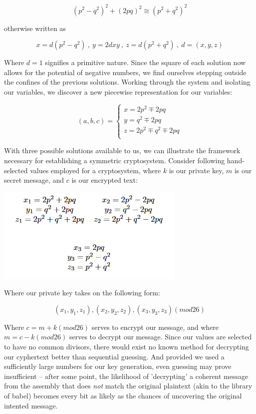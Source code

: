 \documentclass{article}
\begin{document}
$$ (p^2-q^2)^2 +(2pq)^2 \cong (p^2+q^2)^2 $$

otherwise written as

$$ x = d(p^2 - q^2) \ , \ y = 2dxy \ , \  z = d(p^2 + q^2) \ , \ d = (x,y,z) $$

Where $d=1$ signifies a primitive nature. Since the square of each solution now allows for the potential of negative numbers, we find ourselves stepping outside the confines of the previous solutions. Working through the system and isolating our variables, we discover a new piecewise representation for our variables: 


\begin{equation*}
 (a,b,c) = \left\{
        \begin{array}{ll}
            x = 2p^2 \mp 2pq \\
            y = q^2 \mp 2pq \\
            z = 2p^2 \mp q^2 \mp 2pq \\
        \end{array}
    \right.
\end{equation*}

With three possible solutions available to us, we can illustrate the framework necessary for establishing a symmetric cryptosystem. Consider following hand-selected values employed for a cryptosystem, where $k$ is our private key, $m$ is our secret message, and $c$ is our encrypted text:

\begin{center}
    \includegraphics[scale=0.75]{cryptography_latex.PNG}

\end{center}

Where our private key takes on the following form:

$$ (x_1, y_1, z_1), (x_2, y_2, z_2), (x_3, y_3, z_3)(mod26)$$

Where $c = m + k(mod26)$ serves to encrypt our message, and where $m = c - k(mod26)$ serves to decrypt our message. Since our values are selected to have no common divisors, there would exist no known method for decrypting our cyphertext better than sequential guessing. And provided we used a sufficiently large numbers for our key generation, even guessing may prove insufficient -- after some point, the likelihood of 'decrypting' a coherent message from the assembly that does \textit{not} match the original plaintext (akin to the library of babel) becomes every bit as likely as the chances of uncovering the original intented message. \\
\end{document}

